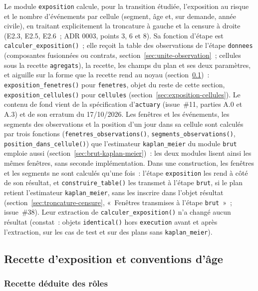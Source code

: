 \documentclass[a4paper,11pt]{article}
\newcommand{\code}[1]{\texttt{\small #1}}
\begin{document}
Le module \code{exposition} calcule, pour la transition étudiée,
l'exposition au risque et le nombre d'événements par cellule (segment, âge
et, sur demande, année civile), en traitant explicitement la troncature à
gauche et la censure à droite (E2.3, E2.5, E2.6~; ADR 0003, points 3, 6 et 8).
Sa fonction d'étape est \code{calculer\_exposition()}~; elle reçoit la table
des observations de l'étape \code{donnees} (composantes fusionnées ou
contrats, section~\ref{sec:unite-observation}~; cellules sous la recette
\code{agregats}), la recette, les champs du plan
et ses deux paramètres, et aiguille sur la forme que la recette rend au
noyau (section~\ref{sec:recettes})~: \code{exposition\_fenetres()} pour
\code{fenetres}, objet du reste de cette section, \code{exposition\_cellules()}
pour \code{cellules} (section~\ref{sec:exposition-cellules}). Le contenu de fond vient de la spécification
d'\code{actuary} (issue~\#11, parties A.0 et A.3) et de son erratum du
17/10/2026. Les fenêtres et les événements, les segments des observations et
la position d'un jour dans sa cellule sont calculés par trois fonctions
(\code{fenetres\_observations()}, \code{segments\_observations()},
\code{position\_dans\_cellule()}) que l'estimateur \code{kaplan\_meier} du
module \code{brut} emploie aussi (section~\ref{sec:brut-kaplan-meier})~:
les deux modules lisent ainsi les mêmes fenêtres, sans seconde
implémentation. Dans une construction, les fenêtres et les segments ne sont
calculés qu'une fois~: l'étape \code{exposition} les rend à côté de son
résultat, et \code{construire\_table()} les transmet à l'étape \code{brut},
si le plan retient l'estimateur \code{kaplan\_meier}, sans les inscrire dans l'objet résultat (section~\ref{sec:troncature-censure},
«~Fenêtres transmises à l'étape \code{brut}~»~; issue~\#38). Leur extraction de \code{calculer\_exposition()} n'a changé
aucun résultat (constat~: objets \code{identical()} hors \code{execution}
avant et après l'extraction, sur les cas de test et sur des plans sans
\code{kaplan\_meier}).

\subsection{Recette d'exposition et conventions d'âge}
\label{sec:recettes}

\subsubsection*{Recette déduite des rôles}
\end{document}
